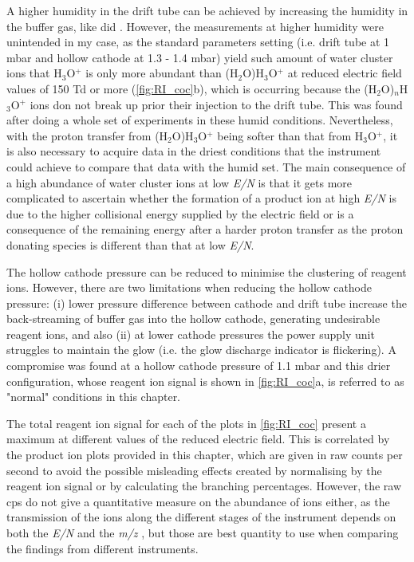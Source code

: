 A higher humidity in the drift tube can be achieved by increasing the humidity in the buffer gas, like \citeauthor{malaskova2019compendium} did \cite{malaskova2019compendium}. However, the measurements at higher humidity were unintended in my case, as the standard parameters setting (i.e. drift tube at 1 mbar and hollow cathode at 1.3 - 1.4 mbar)  yield such amount of water cluster ions that H$_3$O$^+$ is only more abundant than  (H$_2$O)H$_3$O$^+$ at reduced electric field values of 150 Td or more (\autoref{fig:RI_coc}b), which is occurring because the (H$_2$O)$_n$H$_3$O$^+$ ions don not break up prior their injection to the drift tube. This was found after doing a whole set of experiments in these humid conditions.
%
 Nevertheless, with the proton transfer from (H$_2$O)H$_3$O$^+$ being softer than that from H$_3$O$^+$, it is also necessary to acquire data in the driest conditions that the instrument could achieve to compare that data with the humid set. 
The main consequence of a high abundance of water cluster ions at low \textit{E/N} is that it gets more complicated to ascertain whether the formation of a product ion at high \textit{E/N} is due to the higher collisional energy supplied by the electric field or is a consequence of the remaining energy after a harder proton transfer as the proton donating species is different than that at low \textit{E/N}.

The hollow cathode pressure can be reduced to minimise the clustering of reagent ions.
  However, there are two limitations when reducing the hollow cathode pressure: (i) lower pressure difference between cathode and drift tube increase the back-streaming of buffer gas  into the hollow cathode, generating undesirable reagent ions, and also (ii) at lower cathode pressures the  power supply unit struggles to maintain the glow (i.e. the glow discharge indicator is flickering). 
%
A compromise was found at a hollow cathode pressure of 1.1 mbar and this drier configuration, whose reagent ion signal is shown in \autoref{fig:RI_coc}a, is referred to as "normal" conditions in this chapter.
%

The total reagent ion signal for each of the plots in \autoref{fig:RI_coc} present a maximum  at different values of the reduced electric field. This is correlated by the product ion plots provided in this chapter, which are given in raw counts per second to avoid the possible misleading effects created by normalising by the reagent ion signal or by calculating the branching percentages.
%
However, the raw cps do not give a quantitative measure on the abundance of ions  either, as the transmission of the ions along the different stages of the instrument depends on both the \textit{E/N} and the \textit{m/z} , but those are best quantity to use when comparing the findings from different instruments.



